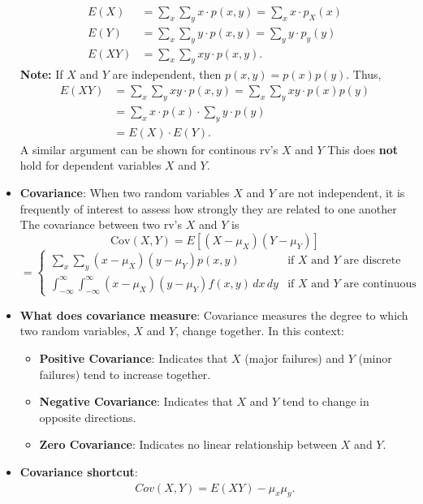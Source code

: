 \documentclass{report}
\begin{document}
\begin{itemize}
\begin{align*}
                E(X) &= \sum_{x}\sum_{y}x \cdot p(x,y) = \sum_{x}x\cdot p_{X}(x) \\
                E(Y) &= \sum_{x}\sum_{y}y \cdot p(x,y) = \sum_{y}y\cdot p_{y}(y) \\
                E(XY) &= \sum_{x}\sum_{y} xy \cdot p(x,y) 
            .\end{align*}
            \bigbreak \noindent 
            \textbf{Note:} If $X$ and $Y$ are independent, then $p(x,y) = p(x)p(y)$. Thus,
            \begin{align*}
                E(XY) &= \sum_x\sum_y xy \cdot p(x,y)  = \sum_x\sum_y xy \cdot p(x)p(y)\\
                      &= \sum_x x \cdot p(x) \cdot \sum_y y \cdot p(y) \\
                      &= E(X) \cdot E(Y)
            .\end{align*}
            A similar argument can be shown for continous rv's $X$ and $Y$
            \bigbreak \noindent 
            This does \textbf{not} hold for dependent variables $X$ and $Y$.
        \item \textbf{Covariance}:
            When two random variables $X$ and $Y$ are not independent, it is frequently of interest to assess how strongly they are related to one another
            \bigbreak \noindent 
            The covariance between two rv's \( X \) and \( Y \) is
            \[
                \text{Cov}(X, Y) = E[(X - \mu_X)(Y - \mu_Y)]
            \]
            \[
                = \begin{cases} 
                    \sum_{x} \sum_{y} (x - \mu_X)(y - \mu_Y) p(x, y) & \text{if } X \text{ and } Y \text{ are discrete} \\[10pt]
                    \int_{-\infty}^{\infty} \int_{-\infty}^{\infty} (x - \mu_X)(y - \mu_Y) f(x, y) \, dx \, dy & \text{if } X \text{ and } Y \text{ are continuous}
                \end{cases}
            \]
        \item \textbf{What does covariance measure}:
            Covariance measures the degree to which two random variables, \( X \) and \( Y \), change together. In this context:
            \begin{itemize}
                \item \textbf{Positive Covariance}: Indicates that \( X \) (major failures) and \( Y \) (minor failures) tend to increase together. 
                \item \textbf{Negative Covariance}: Indicates that \( X \) and \( Y \) tend to change in opposite directions. 
                \item \textbf{Zero Covariance}: Indicates no linear relationship between \( X \) and \( Y \). 
            \end{itemize}
        \item \textbf{Covariance shortcut}:
            \begin{align*}
                Cov(X,Y) = E(XY) - \mu_{x} \mu_{y}
            .\end{align*}


\end{itemize}
\end{document}
